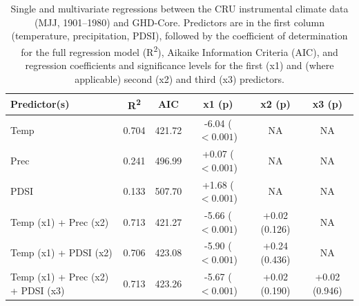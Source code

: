 \documentclass[12pt]{article}
\begin{document}
\begin{table}
\small
\caption{\small Single and multivariate regressions between the CRU instrumental climate data (MJJ, 1901--1980) and GHD-Core. Predictors are in the first column (temperature, precipitation, PDSI), followed by the coefficient of determination for the full regression model (R\textsuperscript{2}), Aikaike Information Criteria (AIC), and regression coefficients and significance levels for the first (x1) and (where applicable) second (x2) and third (x3) predictors.}
\centering
\begin{tabular}{l c c c c c}
\hline
Predictor(s) & R\textsuperscript{2} & AIC & x1 (p) & x2 (p) & x3 (p)\\
\hline
Temp	 & 0.704 & 421.72 & -6.04 ($<0.001$) & NA & NA\\
Prec	 & 0.241 & 496.99 & +0.07 ($<0.001$) & NA & NA\\
PDSI & 0.133 & 507.70 & +1.68 ($<0.001$) & NA & NA\\
\hline
Temp (x1) + Prec (x2) & 0.713 & 421.27 & -5.66 ($<0.001$) & +0.02 (0.126) & NA\\
Temp (x1) + PDSI (x2)	& 0.706 & 423.08 & -5.90 ($<0.001$) & +0.24 (0.436) & NA\\
Temp (x1) + Prec (x2) + PDSI (x3)	& 0.713 & 423.26 & -5.67 ($<0.001$) & +0.02 (0.190) & +0.02 (0.946)\\
\hline
\end{tabular}
\end{table}



\pagebreak

\renewcommand{\figurename}{Supplementary Figure}
\setcounter{figure}{0}
\end{document}
